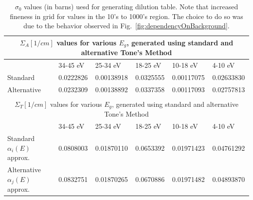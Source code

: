 \documentclass[10pt]{article}
\begin{document}
\begin{table}[H]
  \begin{center}
\begin{tabular}{|l|l|l|l|l|l|}\hline
  \multicolumn{6}{|c|}{$\Sigma_A [1/cm]$ values for various $E_g$, generated using standard and alternative Tone's Method} \\\hline
           &34-45 eV& 25-34 eV   & 18-25 eV   & 10-18 eV & 4-10 eV \\\hline
  Standard   & 0.0222826 & 0.00138918 & 0.0325555 & 0.00117075 & 0.02633830 \\\hline
  Alternative& 0.0232309 & 0.00138892 & 0.0337358 & 0.00117093 & 0.02757813\\\hline&&&&&\\[1pt]\hline
  \multicolumn{6}{|c|}{$\Sigma_T [1/cm]$ values for various $E_g$, generated using standard and alternative Tone's Method} \\\hline
           &34-45 eV& 25-34 eV   & 18-25 eV   & 10-18 eV & 4-10 eV \\\hline
  Standard $\alpha_i(E)$ approx.  & 0.0808003 & 0.01870110& 0.0653392& 0.01971423 &  0.04761292\\\hline
  Alternative $\alpha_j(E)$ approx.& 0.0832751& 0.01870265& 0.0670886& 0.01971482&0.04893870\\\hline


\end{tabular}
    \caption{$\sigma_0$ values (in barns)  uesd for generating dilution table. Note that increased fineness in grid for values in the 10's to 1000's region. The choice to do so was due to the behavior observed in Fig.~\ref{fig:dependencyOnBackground}.}
  \end{center}
\end{table}


  \newpage




  

\end{document}
